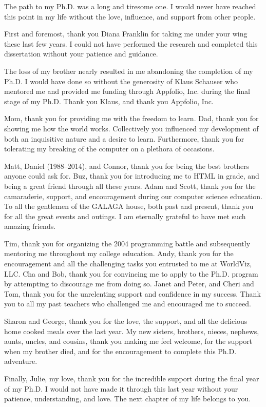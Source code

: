 \begin{acknowledgements}

The path to my Ph.D. was a long and tiresome one. I would never have reached
this point in my life without the love, influence, and support from other
people.

First and foremost, thank you Diana Franklin for taking me under your wing
these last few years. I could not have performed the research and completed
this dissertation without your patience and guidance.

The loss of my brother nearly resulted in me abandoning the completion of my
Ph.D. I would have done so without the generosity of Klaus Schauser who
mentored me and provided me funding through Appfolio, Inc. during the final
stage of my Ph.D. Thank you Klaus, and thank you Appfolio, Inc.

Mom, thank you for providing me with the freedom to learn. Dad, thank you for
showing me how the world works. Collectively you influenced my development of
both an inquisitive nature and a desire to learn. Furthermore, thank you for
tolerating my breaking of the computer on a plethora of occasions.

Matt, Daniel (1988--2014), and Connor, thank you for being the best brothers
anyone could ask for. Buz, thank you for introducing me to HTML in 
grade, and being a great friend through all these years. Adam and Scott, thank
you for the camaraderie, support, and encouragement during our computer science
education. To all the gentlemen of the GALAGA house, both past and present,
thank you for all the great events and outings. I am eternally grateful to have
met such amazing friends.

Tim, thank you for organizing the 2004 programming battle and subsequently
mentoring me throughout my college education. Andy, thank you for the
encouragement and all the challenging tasks you entrusted to me at WorldViz,
LLC. Cha and Bob, thank you for convincing me to apply to the Ph.D. program by
attempting to discourage me from doing so. Janet and Peter, and Cheri and Tom,
thank you for the unrelenting support and confidence in my success. Thank you
to all my past teachers who challenged me and encouraged me to succeed.

Sharon and George, thank you for the love, the support, and all the delicious
home cooked meals over the last year. My new sisters, brothers, nieces,
nephews, aunts, uncles, and cousins, thank you making me feel welcome, for the
support when my brother died, and for the encouragement to complete this
Ph.D. adventure.

Finally, Julie, my love, thank you for the incredible support during the final
year of my Ph.D. I would not have made it through this last year without your
patience, understanding, and love. The next chapter of my life belongs to you.

\end{acknowledgements}
